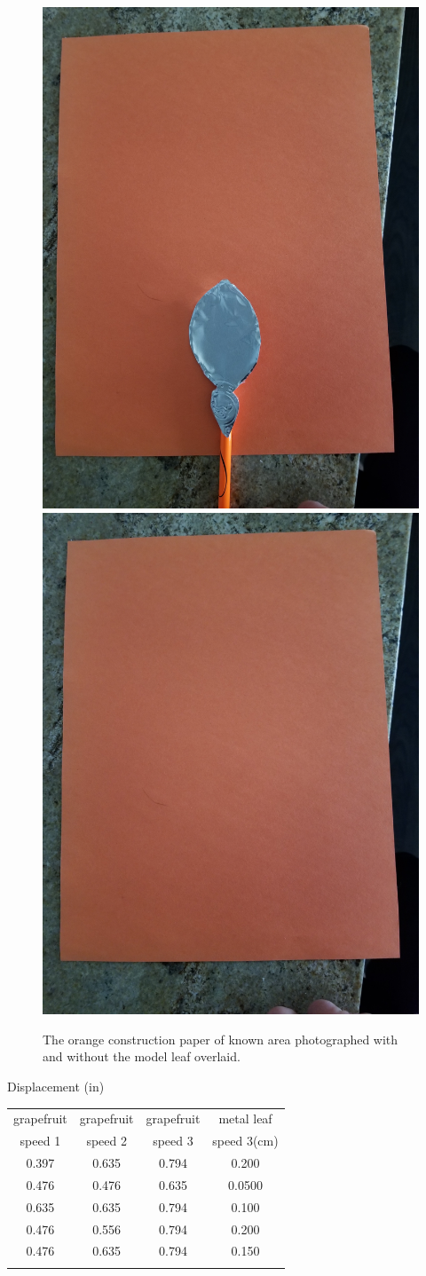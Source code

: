 \begin{figure}
\begin{center}
\includegraphics[width=0.33\columnwidth]{MetalLeaf.jpg}
\includegraphics[width=0.33\columnwidth]{Paper.jpg}
\end{center}
\caption{The orange construction paper of known area photographed with and without the model leaf overlaid.}
\label{fig:Appendix2}
\end{figure}
\begin{table}
\begin{center}
Displacement (\si{in})\\
\begin{tabular}{cccc}
\toprule
grapefruit & grapefruit & grapefruit & metal leaf \\
speed 1 & speed 2 & speed 3 & speed 3(cm) \\ 
\midrule
0.397 & 0.635 & 0.794 & 0.200 \\
0.476 & 0.476 & 0.635 & 0.0500 \\
0.635 & 0.635 & 0.794 & 0.100 \\
0.476 & 0.556 & 0.794 & 0.200 \\
0.476 & 0.635 & 0.794 & 0.150 \\
\label{tb2:Table2}
\bottomrule
\end{tabular}
\end{center}
\end{table}
